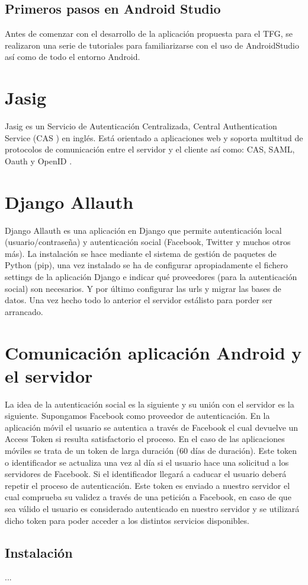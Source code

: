 \subsection{Primeros pasos en Android Studio}

Antes de comenzar con el desarrollo de la aplicación propuesta para el TFG, se 
realizaron una serie de tutoriales \cite{URL::GettingStarted, URL::SavingData} 
para familiarizarse con el uso de AndroidStudio así como de todo el entorno Android.

\section{Jasig}

Jasig \cite{URL::Jasig} es un Servicio de Autenticación Centralizada, Central 
Authentication Service (CAS \cite{URL::CAS}) en inglés.  
Está orientado a aplicaciones web y soporta multitud de protocolos de comunicación 
entre el servidor y el cliente así como: 
CAS, SAML, Oauth \cite{URL::Oauth} y OpenID \cite{URL::OpenID}.

\section{Django Allauth}

Django Allauth \cite{URL::allauth} es una aplicación en Django \cite{URL::Django} 
que permite autenticación local (usuario/contraseña) y autenticación social 
(Facebook, Twitter y muchos otros más). La instalación se hace mediante el 
sistema de gestión de paquetes de Python \cite{URL::Python} (pip), 
una vez instalado se ha de configurar apropiadamente el fichero settings de la 
aplicación Django e indicar qué proveedores (para la autenticación social) son 
necesarios. Y por último configurar las urls y migrar las bases de datos. Una vez 
hecho todo lo anterior el servidor estálisto para porder ser arrancado.

\section{Comunicación aplicación Android y el servidor}
La idea de la autenticación social es la siguiente y su unión con el servidor es 
la siguiente. Supongamos Facebook como proveedor de autenticación. En la aplicación 
móvil el usuario se autentica a través de Facebook el cual devuelve un Access Token
si resulta satisfactorio el proceso. En el caso de las aplicaciones móviles se trata 
de un token de larga duración (60 días de duración). Este token o identificador 
se actualiza una vez al día si el usuario hace una solicitud a los servidores de 
Facebook. Si el identificador llegará a caducar el usuario deberá repetir el proceso
de autenticación. Este token es enviado a nuestro servidor el cual comprueba su validez
a través de una petición a Facebook, en caso de que sea válido el usuario es considerado
autenticado en nuestro servidor y se utilizará dicho token para poder acceder a los 
distintos servicios disponibles.

\subsection{Instalación}
...


